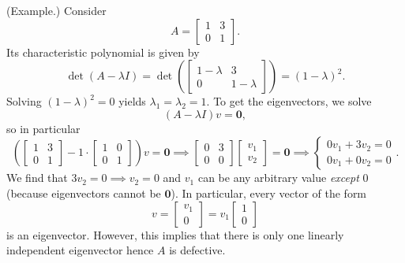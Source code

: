 \documentclass[letterpaper]{article}
\newcommand{\0}{\mathbf{0}}
\begin{document}
\begin{mdframed}
    (Example.) Consider \[A = \begin{bmatrix}
        1 & 3 \\ 0 & 1
    \end{bmatrix}.\] Its characteristic polynomial is given by \[\det(A - \lambda I) = \det\left(\begin{bmatrix}
        1 - \lambda & 3 \\ 0 & 1 - \lambda
    \end{bmatrix}\right) = (1 - \lambda)^2.\] Solving $(1 - \lambda)^2 = 0$ yields $\lambda_1 = \lambda_2 = 1$. To get the eigenvectors, we solve \[(A - \lambda I)v = \0,\] so in particular \[\left(\begin{bmatrix}
        1 & 3 \\ 0 & 1
    \end{bmatrix} - 1 \cdot \begin{bmatrix}
        1 & 0 \\ 0 & 1
    \end{bmatrix}\right)v = \0 \implies \begin{bmatrix}
        0 & 3 \\ 0 & 0
    \end{bmatrix} \begin{bmatrix}
        v_1 \\ v_2
    \end{bmatrix} = \0 \implies \begin{cases}
        0v_1 + 3v_2 = 0 \\ 
        0v_1 + 0v_2 = 0
    \end{cases}.\] We find that $3v_2 = 0 \implies v_2 = 0$ and $v_1$ can be any arbitrary value \emph{except} 0 (because eigenvectors cannot be $\0$). In particular, every vector of the form \[v = \begin{bmatrix}
        v_1 \\ 0 
    \end{bmatrix} = v_1 \begin{bmatrix}
        1 \\ 0
    \end{bmatrix}\] is an eigenvector. However, this implies that there is only one linearly independent eigenvector hence $A$ is defective.
\end{mdframed}
\end{document}
